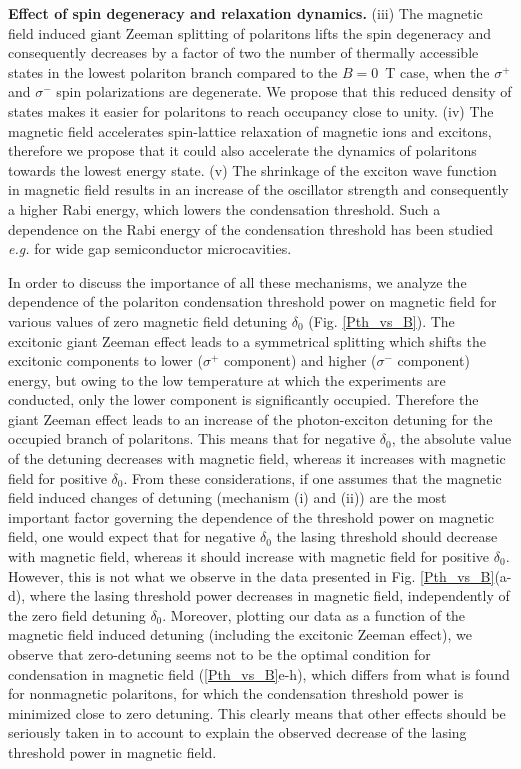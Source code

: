 \documentclass[amssymb,prb,twocolumn,floats,amsmath]{revtex4}
\begin{document}
\textbf{Effect of spin degeneracy and relaxation dynamics.} (iii) The magnetic field induced giant Zeeman splitting of polaritons lifts the spin degeneracy and consequently decreases by a factor of two the number of thermally accessible states\cite{Leggett_RevModPhys} in the lowest polariton branch compared to the $B=0$~T case,  when the $\sigma^+$ and $\sigma^-$ spin polarizations are degenerate. We propose that this reduced density of states makes it easier for polaritons to reach occupancy close to unity. (iv) The magnetic field accelerates spin-lattice relaxation of magnetic ions\cite{Strutz_PRL92,Dietl_PRL1995,Scherbakov_PRB2000,Goryca_PRL2009QW,Goryca_PRB2015} and excitons\cite{Smolenski_PRB2015}, therefore we propose that it could also accelerate the dynamics of polaritons towards the lowest energy state. (v) The shrinkage of the exciton wave function in magnetic field results in an increase of the oscillator strength and consequently a higher Rabi energy, which lowers the condensation threshold. Such a dependence on the Rabi energy of the condensation threshold has been studied \emph{e.g.} for wide gap semiconductor microcavities.\cite{Johne_APL2008, Jamadi_PRB2016}

In order to discuss the importance of all these mechanisms, we analyze the dependence of the polariton condensation threshold power on magnetic field for various values of zero magnetic field detuning $\delta_0$ (Fig. \ref{Pth_vs_B}). The excitonic giant Zeeman effect leads to a symmetrical splitting which shifts the excitonic components to lower ($\sigma^+$ component) and higher ($\sigma^-$ component) energy, but owing to the low temperature at which the experiments are conducted, only the lower component is significantly occupied. Therefore the giant Zeeman effect leads to an increase of the photon-exciton detuning for the occupied branch of polaritons. This means that for negative $\delta_0$, the absolute value of the detuning decreases with magnetic field, whereas it increases with magnetic field for positive $\delta_0$.
From these considerations, if one assumes that the magnetic field induced changes of detuning (mechanism (i) and (ii)) are the most important factor governing the dependence of the threshold power on magnetic field, one would expect that for negative $\delta_0$ the lasing threshold should decrease with magnetic field, whereas it should increase with magnetic field for positive $\delta_0$. However, this is not what we observe in the data presented in Fig. \ref{Pth_vs_B}(a-d), where the lasing threshold power decreases in magnetic field, independently of the zero field detuning $\delta_0$. Moreover, plotting our data as a function of the magnetic field induced detuning (including the excitonic Zeeman effect), we observe that zero-detuning seems not to be the optimal condition for condensation in magnetic field (\ref{Pth_vs_B}e-h), which differs from what is found for nonmagnetic polaritons, for which the condensation threshold power is minimized close to zero detuning. This clearly means that other effects should be seriously taken in to account to explain the observed decrease of the lasing threshold power in magnetic field.
\end{document}
